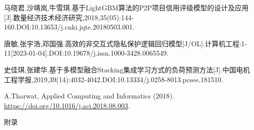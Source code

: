 \documentclass{MathorCupmodeling}
\begin{document}
\begin{spacing}{1.08}
\begin{thebibliography}{99}
	马晓君,沙靖岚,牛雪琪.基于LightGBM算法的P2P项目信用评级模型的设计及应用[J].数量经济技术经济研究,2018,35(05):144-160.DOI:10.13653/j.cnki.jqte.20180503.001.

	唐敏,张宇浩,邓国强.高效的非交互式隐私保护逻辑回归模型[J/OL].计算机工程:1-11[2023-01-04].DOI:10.19678/j.issn.1000-3428.0065549.

	史佳琪,张建华.基于多模型融合Stacking集成学习方式的负荷预测方法[J].中国电机工程学报,2019,39(14):4032-4042.DOI:10.13334/j.0258-8013.pcsee.181510.

	A.Tharwat, Applied Computing and Informatics (2018). \url{https://doi.org/10.1016/j.aci.2018.08.003}.
	\end{thebibliography}
	\end{spacing}
	\newpage


	\begin{center}
		\heiti{} 附\hspace{2pc}录
	\end{center}

\newpage
	~\\
\end{document}
